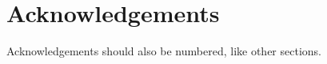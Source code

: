 \documentclass{nato-sto}
\begin{document}
\section{Acknowledgements}

Acknowledgements should also be numbered, like other sections.


\end{document}
